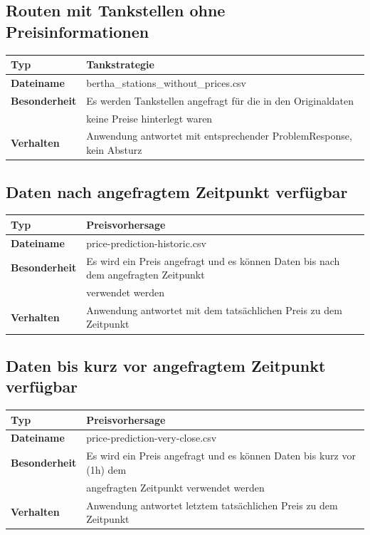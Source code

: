 \documentclass[
ngerman          %
,a4paper          %
,11pt
,pdftex
]{report}
\begin{document}
\subsection{Routen mit Tankstellen ohne Preisinformationen}

\begin{table}[H]
	\centering
	\begin{tabular}{l l}
		\textbf{Typ} & \textbf{Tankstrategie} \\ 
		\hline
		\hline
		\textbf{Dateiname} & bertha\_stations\_without\_prices.csv \\
        \textbf{Besonderheit} & Es werden Tankstellen angefragt für die in den Originaldaten \\ 
        & keine Preise hinterlegt waren \\
        \textbf{Verhalten} & Anwendung antwortet mit entsprechender ProblemResponse, kein Absturz \\
		\hline 
	\end{tabular}
\end{table} 

\subsection{Daten nach angefragtem Zeitpunkt verfügbar}

\begin{table}[H]
	\centering
	\begin{tabular}{l p{12cm}}
		\textbf{Typ} & \textbf{Preisvorhersage} \\ 
		\hline
		\hline
		\textbf{Dateiname} & price-prediction-historic.csv \\
        \textbf{Besonderheit} & Es wird ein Preis angefragt und es können Daten bis nach dem angefragten Zeitpunkt \\
        & verwendet werden \\
        \textbf{Verhalten} & Anwendung antwortet mit dem tatsächlichen Preis zu dem Zeitpunkt \\
		\hline 
	\end{tabular}
\end{table} 


\subsection{Daten bis kurz vor angefragtem Zeitpunkt verfügbar}

\begin{table}[H]
	\centering
	\begin{tabular}{l l}
		\textbf{Typ} & \textbf{Preisvorhersage} \\ 
		\hline
		\hline
		\textbf{Dateiname} & price-prediction-very-close.csv \\
        \textbf{Besonderheit} & Es wird ein Preis angefragt und es können Daten bis kurz vor (1h) dem \\
        & angefragten Zeitpunkt verwendet werden \\
        \textbf{Verhalten} & Anwendung antwortet letztem tatsächlichen Preis zu dem Zeitpunkt \\
		\hline 
	\end{tabular}
\end{table} 
\end{document}
